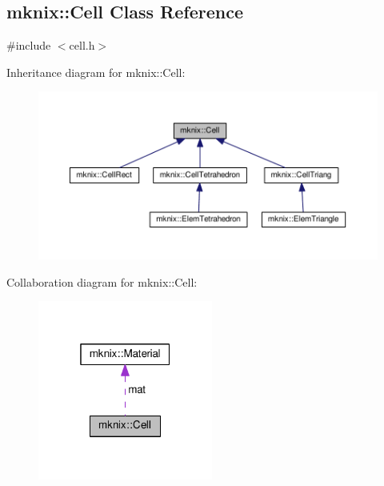 \hypertarget{classmknix_1_1_cell}{}\subsection{mknix\+:\+:Cell Class Reference}
\label{classmknix_1_1_cell}


{\ttfamily \#include $<$cell.\+h$>$}



Inheritance diagram for mknix\+:\+:Cell\+:\nopagebreak
\begin{figure}[H]
\begin{center}
\leavevmode
\includegraphics[width=350pt]{d4/d8c/classmknix_1_1_cell__inherit__graph}
\end{center}
\end{figure}


Collaboration diagram for mknix\+:\+:Cell\+:\nopagebreak
\begin{figure}[H]
\begin{center}
\leavevmode
\includegraphics[width=163pt]{d0/d8c/classmknix_1_1_cell__coll__graph}
\end{center}
\end{figure}
